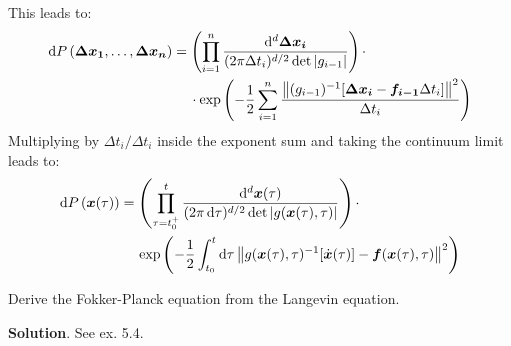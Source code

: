 \documentclass[../template.tex]{subfiles}
\begin{document}
\begin{exo}
    This leads to:
    \begin{align*}
        \dd{P}(\bm{\Delta x_1}, \dots,\bm{\Delta x_n}) &= \left(\prod_{i=1}^n \frac{\dd[d]{ \bm{\Delta x_i}}}{(2 \pi \Delta t_i)^{d/2} \operatorname{det}|g_{i-1}| }   \right) \cdot\\
        &\quad \> \cdot \exp\left(-\frac{1}{2} \sum_{i=1}^n \frac{\norm{(g_{i-1})^{-1} [ \bm{\Delta x_i} - \bm{f_{i-1}}\Delta t_i]}^2 }{\Delta t_i}  \right)
    \end{align*}
    Multiplying by $\Delta t_i / \Delta t_i$ inside the exponent sum and taking the continuum limit leads to:
    \begin{align*}
        \dd{P}(\bm{x}(\tau)) &= \left(\prod_{\tau=t_0^+}^t \frac{\dd[d]{\bm{x}(\tau)}}{(2 \pi \dd{\tau} )^{d/2} \operatorname{det}|g(\bm{x}(\tau), \tau)| } \right) \cdot \\
        &\quad \> \exp\left(-\frac{1}{2} \int_{t_0}^t \dd{\tau} \norm{g(\bm{x}(\tau), \tau)^{-1} [\dot{\bm{x}}(\tau)] - {\bm{f}(\bm{x}(\tau), \tau)} }^2 \right)
    \end{align*}
\end{exo}

\begin{exo}
    Derive the Fokker-Planck equation from the Langevin equation.
    \medskip

    \textbf{Solution}. See ex. 5.4. %
\end{exo}
\end{document}
